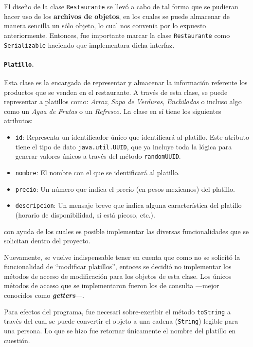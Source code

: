 El diseño de la clase \texttt{Restaurante} se llevó a cabo de tal forma que 
se pudieran hacer uso de los \textbf{archivos de objetos}, en los cuales se 
puede almacenar de manera sencilla un sólo objeto, lo cual nos convenía por 
lo expuesto anteriormente. Entonces, fue importante marcar la clase 
\texttt{Restaurante} como \texttt{Serializable} haciendo que implementara 
dicha interfaz.

\paragraph{\texttt{Platillo}. } Esta clase es la encargada de representar y 
almacenar la información referente los productos que se venden en el 
restaurante. A través de esta clase, se puede representar a platillos como:
\textit{Arroz}, \textit{Sopa de Verduras}, \textit{Enchiladas} o incluso algo 
como un \textit{Agua de Frutas} o un \textit{Refresco}. La clase en sí tiene 
los siguientes atributos:

\begin{itemize}
  \item \texttt{id}: Representa un identificador único que identificará al 
    platillo. Este atributo tiene el tipo de dato \texttt{java.util.UUID}, que 
    ya incluye toda la lógica para generar valores únicos a través del método 
    \texttt{randomUUID}.
  \item \texttt{nombre}: El nombre con el que se identificará al platillo.
  \item \texttt{precio}: Un número que indica el precio (en pesos mexicanos) 
    del platillo.
  \item \texttt{descripcion}: Un mensaje breve que indica alguna característica 
    del platillo (horario de disponibilidad, si está picoso, etc.).
\end{itemize}

con ayuda de los cuales es posible implementar las diversas funcionalidades que 
se solicitan dentro del proyecto.

Nuevamente, se vuelve indispensable tener en cuenta que como no se solicitó la 
funcionalidad de ``modificar platillos'', entoces se decidió no implementar los 
métodos de acceso de modificación para los objetos de esta clase. Los únicos 
métodos de acceso que se implementaron fueron los de consulta ---mejor conocidos
como \textit{\textbf{getters}}---.

Para efectos del programa, fue necesari sobre-excribir el método \texttt{toString} 
a través del cual se puede convertir el objeto a una cadena (\texttt{String}) 
legible para una persona. Lo que se hizo fue retornar únicamente el nombre del 
platillo en cuestión.

